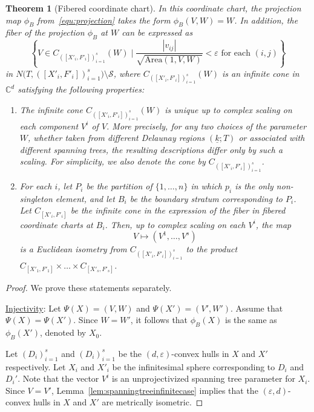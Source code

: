 \documentclass{compositio}
\numberwithin{equation}{section}
\numberwithin{figure}{section}
\theoremstyle{definition}
\theoremstyle{plain}
\newtheorem{theorem}[definition]{Theorem}
\begin{document}
{\begin{theorem}[Fibered coordinate chart]
    In this coordinate chart, the projection map $\phi_B$ from~\eqref{equ:projection} takes the form $\phi_B(V,W) = W$. In addition, the fiber of the projection $\phi_B$ at $W$ can be expressed as 
    \begin{equation}\label{equ:fiberexpression}
        \left\{V \in C_{([X'_i, F'_i])_{i=1}^s}(W) \mid \frac{|v_{ij}|}{\sqrt{\mathrm{Area}(1, V, W)}} < \varepsilon \text{ for each } (i, j)\right\}
    \end{equation}
    in $N\big(T, ([X'_i, F'_i])_{i=1}^s\big) \setminus \mathcal{S}$, where $C_{([X'_i, F'_i])_{i=1}^s}(W)$ is an infinite cone in $\mathbb{C}^d$ satisfying the following properties:
    \begin{enumerate}
    \item The infinite cone $C_{([X'_i, F'_i])_{i=1}^s}(W)$ is unique up to complex scaling on each component $V^i$ of $V$. More precisely, for any two choices of the parameter $W$, whether taken from different Delaunay regions $(\underline{k};T)$ or associated with different spanning trees, the resulting descriptions differ only by such a scaling. For simplicity, we also denote the cone by $C_{([X'_i, F'_i])_{i=1}^s}$.
    \item For each $i$, let $P_i$ be the partition of $\{1,\ldots,n\}$ in which $p_i$ is the only non-singleton element, and let $B_i$ be the boundary stratum corresponding to $P_i$. Let $C_{[X'_i, F'_i]}$ be the infinite cone in the expression of the fiber in fibered coordinate charts at $B_i$. Then, up to complex scaling on each $V^i$, the map
    $$V\mapsto (V^1,\ldots,V^s)$$
    is a Euclidean isometry from $C_{([X'_i, F'_i])_{i=1}^s}$ to the product $C_{[X'_1, F'_1]} \times \ldots \times C_{[X'_s, F'_s]}$.
    \end{enumerate}
\end{theorem}

\begin{proof}
We prove these statements separately.\newline

\noindent\underline{Injectivity}:
Let $\Psi(X) = (V,W)$ and $\Psi(X')=(V',W')$. Assume that $\Psi(X) = \Psi(X')$. Since $W=W'$, it follows that $\phi_B(X)$ is the same as $\phi_B(X')$, denoted by $X_0$. 

Let $(D_i)_{i=1}^s$ and $(D_i)_{i=1}^s$ be the $(d,\varepsilon)$-convex hulls in $X$ and $X'$ respectively. Let $X_i$ and $X'_i$ be the infinitesimal sphere corresponding to $D_i$ and $D_i'$. Note that the vector $V^i$ is an unprojectivized spanning tree parameter for $X_i$. Since $V = V'$, Lemma~\ref{lem:spanningtreeinfinitecase} implies that the $(\varepsilon, d)$-convex hulls in $X$ and $X'$ are metrically isometric. 


\end{proof}}
\end{document}

